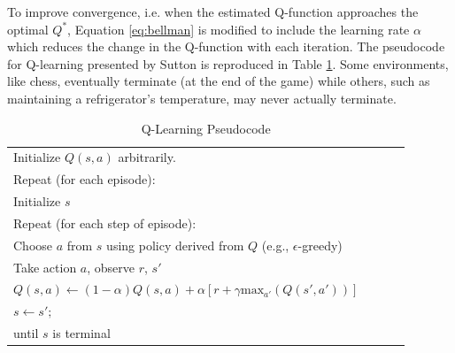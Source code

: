 To improve convergence, i.e. when the estimated Q-function approaches the optimal $Q^*$, Equation \ref{eq:bellman} is modified to include the learning rate $\alpha$ which reduces the change in the Q-function with each iteration. The pseudocode for Q-learning presented by Sutton is reproduced in Table \ref{tab:qlearning_pseudo}. Some environments, like chess, eventually terminate (at the end of the game) while others, such as maintaining a refrigerator's temperature, may never actually terminate.
\begin{table}[h]
	\caption{Q-Learning Pseudocode}  \label{tab:qlearning_pseudo}
	\begin{tabular}{|p{0.9\linewidth}|}\hline %
		Initialize $Q(s,a)$ arbitrarily. \\
		Repeat (for each episode): \\
		\qquad Initialize $s$\\
		\qquad Repeat (for each step of episode):\\
		\qquad \qquad Choose $a$ from $s$ using policy derived from $Q$ (e.g., $\epsilon$-greedy)\\
		\qquad \qquad Take action $a$, observe $r$, $s'$\\
		\qquad \qquad $Q(s,a)\gets (1-\alpha)Q(s,a) + \alpha [r + \gamma \text{max}_{a'}(Q(s',a'))]$\\
		\qquad \qquad $s \gets s';$\\
		\qquad until $s$ is terminal \\
		\hline
	\end{tabular}
\end{table}

